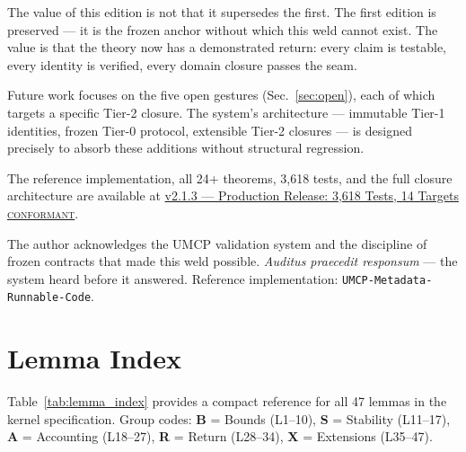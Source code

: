\documentclass[
  aps,
  prd,
  preprint,
  superscriptaddress,
  nofootinbib,
  floatfix,
  longbibliography
]{revtex4-2}
\newcommand{\regime}[1]{\textrm{\upshape\scshape#1}}
\newcommand{\lat}[1]{\textit{#1}}
\begin{document}
The value of this edition is not that it supersedes the first.
The first edition is preserved — it is the frozen anchor
without which this weld cannot exist.
The value is that the theory now has a demonstrated return:
every claim is testable, every identity is verified,
every domain closure passes the seam.

Future work focuses on the five open gestures
(Sec.~\ref{sec:open}), each of which targets a specific
Tier-2 closure. The system's architecture —
immutable Tier-1 identities, frozen Tier-0 protocol,
extensible Tier-2 closures — is designed precisely
to absorb these additions without structural regression.

The reference implementation, all 24+ theorems,
3{,}618 tests, and the full closure architecture are
available at
\href{https://github.com/calebpruett927/GENERATIVE-COLLAPSE-DYNAMICS/releases/tag/v2.1.3}{v2.1.3 --- Production Release: 3{,}618 Tests, 14 Targets \regime{conformant}}.

\begin{acknowledgments}
The author acknowledges the UMCP validation system and the
discipline of frozen contracts that made this weld possible.
\lat{Auditus praecedit responsum} --- the system heard before
it answered. Reference implementation:
\texttt{UMCP-Metadata-Runnable-Code}.
\end{acknowledgments}



\appendix

\section{Lemma Index}\label{app:lemmas}

Table~\ref{tab:lemma_index} provides a compact reference
for all 47 lemmas in the kernel specification.
Group codes: \textbf{B} = Bounds (L1--10),
\textbf{S} = Stability (L11--17),
\textbf{A} = Accounting (L18--27),
\textbf{R} = Return (L28--34),
\textbf{X} = Extensions (L35--47).
\end{document}
